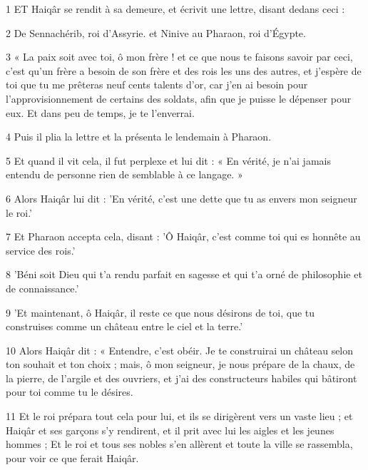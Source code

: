 \par 1 ET Haiqâr se rendit à sa demeure, et écrivit une lettre, disant dedans ceci :

\par 2 De Sennachérib, roi d'Assyrie. et Ninive au Pharaon, roi d'Égypte.

\par 3 « La paix soit avec toi, ô mon frère ! et ce que nous te faisons savoir par ceci, c'est qu'un frère a besoin de son frère et des rois les uns des autres, et j'espère de toi que tu me prêteras neuf cents talents d'or, car j'en ai besoin pour l'approvisionnement de certains des soldats, afin que je puisse le dépenser pour eux. Et dans peu de temps, je te l'enverrai.

\par 4 Puis il plia la lettre et la présenta le lendemain à Pharaon.

\par 5 Et quand il vit cela, il fut perplexe et lui dit : « En vérité, je n'ai jamais entendu de personne rien de semblable à ce langage. »

\par 6 Alors Haiqâr lui dit : 'En vérité, c'est une dette que tu as envers mon seigneur le roi.'

\par 7 Et Pharaon accepta cela, disant : 'Ô Haiqâr, c'est comme toi qui es honnête au service des rois.'

\par 8 'Béni soit Dieu qui t'a rendu parfait en sagesse et qui t'a orné de philosophie et de connaissance.'

\par 9 'Et maintenant, ô Haiqâr, il reste ce que nous désirons de toi, que tu construises comme un château entre le ciel et la terre.'

\par 10 Alors Haiqâr dit : « Entendre, c'est obéir. Je te construirai un château selon ton souhait et ton choix ; mais, ô mon seigneur, je nous prépare de la chaux, de la pierre, de l'argile et des ouvriers, et j'ai des constructeurs habiles qui bâtiront pour toi comme tu le désires.

\par 11 Et le roi prépara tout cela pour lui, et ils se dirigèrent vers un vaste lieu ; et Haiqâr et ses garçons s'y rendirent, et il prit avec lui les aigles et les jeunes hommes ; Et le roi et tous ses nobles s'en allèrent et toute la ville se rassembla, pour voir ce que ferait Haiqâr.

